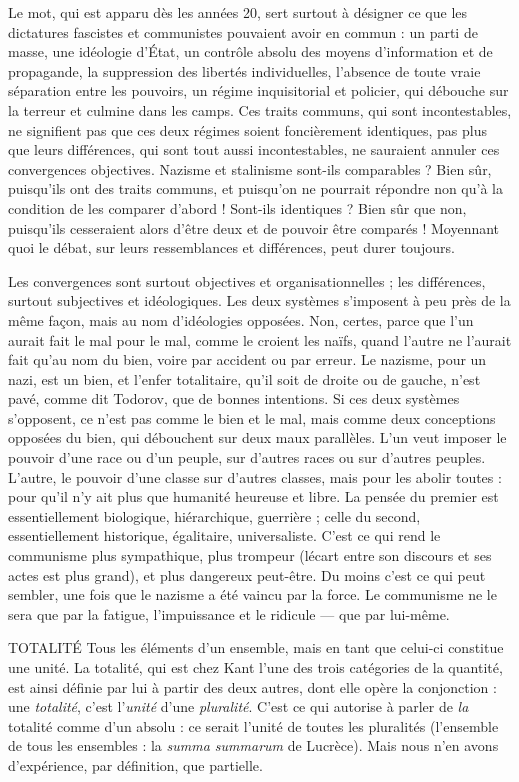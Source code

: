 Le mot, qui est apparu dès les années 20, sert surtout à désigner ce que les
dictatures fascistes et communistes pouvaient avoir en commun : un parti de
masse, une idéologie d’État, un contrôle absolu des moyens d’information et de
propagande, la suppression des libertés individuelles, l’absence de toute vraie
séparation entre les pouvoirs, un régime inquisitorial et policier, qui débouche
sur la terreur et culmine dans les camps. Ces traits communs, qui sont incontestables,
ne signifient pas que ces deux régimes soient foncièrement identiques,
pas plus que leurs différences, qui sont tout aussi incontestables, ne sauraient
annuler ces convergences objectives. Nazisme et stalinisme sont-ils
comparables ? Bien sûr, puisqu'ils ont des traits communs, et puisqu’on ne
pourrait répondre non qu’à la condition de les comparer d’abord ! Sont-ils
identiques ? Bien sûr que non, puisqu'ils cesseraient alors d’être deux et de pouvoir
être comparés ! Moyennant quoi le débat, sur leurs ressemblances et différences,
peut durer toujours.

Les convergences sont surtout objectives et organisationnelles ; les différences,
surtout subjectives et idéologiques. Les deux systèmes s’imposent à peu
près de la même façon, mais au nom d’idéologies opposées. Non, certes, parce
que l’un aurait fait le mal pour le mal, comme le croient les naïfs, quand l’autre
ne l’aurait fait qu’au nom du bien, voire par accident ou par erreur. Le nazisme,
pour un nazi, est un bien, et l’enfer totalitaire, qu’il soit de droite ou de
gauche, n’est pavé, comme dit Todorov, que de bonnes intentions. Si ces deux
systèmes s'opposent, ce n’est pas comme le bien et le mal, mais comme deux
conceptions opposées du bien, qui débouchent sur deux maux parallèles. L’un
veut imposer le pouvoir d’une race ou d’un peuple, sur d’autres races ou sur
d’autres peuples. L'autre, le pouvoir d’une classe sur d’autres classes, mais
pour les abolir toutes : pour qu’il n’y ait plus que humanité heureuse et libre.
La pensée du premier est essentiellement biologique, hiérarchique, guerrière ;
celle du second, essentiellement historique, égalitaire, universaliste. C’est ce
qui rend le communisme plus sympathique, plus trompeur (lécart entre son
discours et ses actes est plus grand), et plus dangereux peut-être. Du moins
c’est ce qui peut sembler, une fois que le nazisme a été vaincu par la force. Le
communisme ne le sera que par la fatigue, l'impuissance et le ridicule — que
par lui-même.

TOTALITÉ Tous les éléments d’un ensemble, mais en tant que celui-ci constitue
une unité. La totalité, qui est chez Kant l’une des trois catégories
de la quantité, est ainsi définie par lui à partir des deux autres, dont elle
opère la conjonction : une {\it totalité}, c’est l'{\it unité} d’une {\it pluralité}. C'est ce qui
autorise à parler de {\it la} totalité comme d’un absolu : ce serait l’unité de toutes les
pluralités (l’ensemble de tous les ensembles : la {\it summa summarum} de Lucrèce).
Mais nous n’en avons d’expérience, par définition, que partielle.

